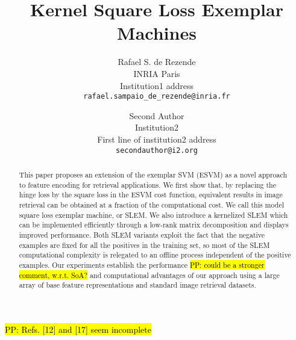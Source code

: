 \documentclass[10pt,twocolumn,letterpaper]{article}
\newcommand{\hlc}[2][yellow]{{\sethlcolor{#1}\hl{#2}}}
\newcommand{\PP}[1]{\hlc[green]{PP: #1}}
\begin{document}
\title{Kernel Square Loss Exemplar Machines}

\author{Rafael S. de Rezende\\
INRIA Paris\\
Institution1 address\\
{\tt\small rafael.sampaio_de_rezende@inria.fr}
\and
Second Author\\
Institution2\\
First line of institution2 address\\
{\tt\small secondauthor@i2.org}
}

\maketitle
\begin{abstract}
This paper proposes an extension of the exemplar SVM (ESVM) as a novel approach to feature encoding for retrieval applications.
We first show that, by replacing the hinge loss by the square loss in the ESVM cost function, equivalent results in image retrieval can be obtained at a fraction of the computational cost. 
We call this model square loss exemplar machine, or SLEM. 
We also introduce a kernelized SLEM which can be implemented efficiently through a low-rank matrix decomposition and
displays improved performance. 
Both SLEM variants exploit the fact that the negative examples are fixed for all the positives in the training set, so most of the SLEM computational complexity is relegated to an offline process independent of the positive examples. 
Our experiments establish the performance \PP{could be a stronger comment, w.r.t. SoA?} and computational advantages of our approach using a large array of base feature representations and standard image retrieval datasets.
\end{abstract}



%









%


\PP{Refs. [12] and [17] seem incomplete}
{\small
 

}
\end{document}
